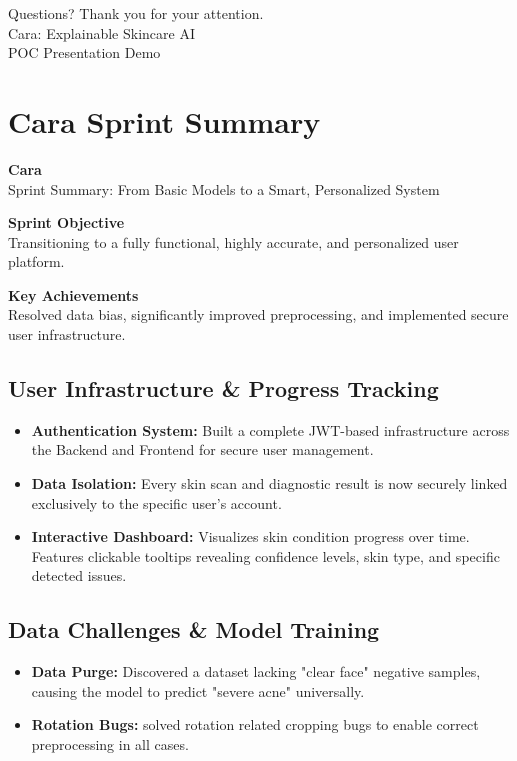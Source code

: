 \documentclass[12pt,a4paper]{article}
\begin{document}
Questions? Thank you for your attention.\\
Cara: Explainable Skincare AI\\
POC Presentation Demo

\newpage
\section{Cara Sprint Summary}

\textbf{Cara}\\
Sprint Summary: From Basic Models to a Smart, Personalized System

\textbf{Sprint Objective}\\
Transitioning to a fully functional, highly accurate, and personalized user platform.

\textbf{Key Achievements}\\
Resolved data bias, significantly improved preprocessing, and implemented secure user infrastructure.

\subsection{User Infrastructure \& Progress Tracking}
\begin{itemize}
    \item \textbf{Authentication System:} Built a complete JWT-based infrastructure across the Backend and Frontend for secure user management.
    \item \textbf{Data Isolation:} Every skin scan and diagnostic result is now securely linked exclusively to the specific user's account.
    \item \textbf{Interactive Dashboard:} Visualizes skin condition progress over time. Features clickable tooltips revealing confidence levels, skin type, and specific detected issues.
\end{itemize}

\subsection{Data Challenges \& Model Training}
\begin{itemize}
    \item \textbf{Data Purge:} Discovered a dataset lacking "clear face" negative samples, causing the model to predict "severe acne" universally.
    \item \textbf{Rotation Bugs:} solved rotation related cropping bugs to enable correct preprocessing in all cases.
\end{itemize}
\end{document}
